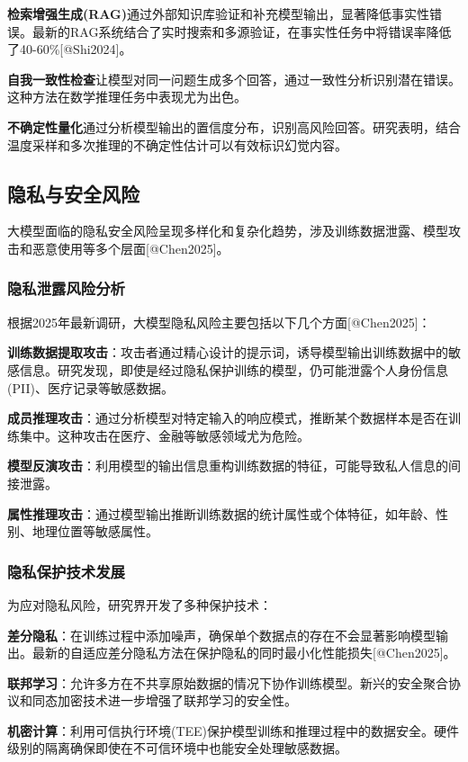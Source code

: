 \documentclass{article}
\begin{document}
\textbf{检索增强生成(RAG)}通过外部知识库验证和补充模型输出，显著降低事实性错误。最新的RAG系统结合了实时搜索和多源验证，在事实性任务中将错误率降低了40-60\%[@Shi2024]。

\textbf{自我一致性检查}让模型对同一问题生成多个回答，通过一致性分析识别潜在错误。这种方法在数学推理任务中表现尤为出色。

\textbf{不确定性量化}通过分析模型输出的置信度分布，识别高风险回答。研究表明，结合温度采样和多次推理的不确定性估计可以有效标识幻觉内容。

\subsection{隐私与安全风险}
大模型面临的隐私安全风险呈现多样化和复杂化趋势，涉及训练数据泄露、模型攻击和恶意使用等多个层面[@Chen2025]。

\subsubsection{隐私泄露风险分析}
根据2025年最新调研，大模型隐私风险主要包括以下几个方面[@Chen2025]：

\textbf{训练数据提取攻击}：攻击者通过精心设计的提示词，诱导模型输出训练数据中的敏感信息。研究发现，即使是经过隐私保护训练的模型，仍可能泄露个人身份信息(PII)、医疗记录等敏感数据。

\textbf{成员推理攻击}：通过分析模型对特定输入的响应模式，推断某个数据样本是否在训练集中。这种攻击在医疗、金融等敏感领域尤为危险。

\textbf{模型反演攻击}：利用模型的输出信息重构训练数据的特征，可能导致私人信息的间接泄露。

\textbf{属性推理攻击}：通过模型输出推断训练数据的统计属性或个体特征，如年龄、性别、地理位置等敏感属性。

\subsubsection{隐私保护技术发展}
为应对隐私风险，研究界开发了多种保护技术：

\textbf{差分隐私}：在训练过程中添加噪声，确保单个数据点的存在不会显著影响模型输出。最新的自适应差分隐私方法在保护隐私的同时最小化性能损失[@Chen2025]。

\textbf{联邦学习}：允许多方在不共享原始数据的情况下协作训练模型。新兴的安全聚合协议和同态加密技术进一步增强了联邦学习的安全性。

\textbf{机密计算}：利用可信执行环境(TEE)保护模型训练和推理过程中的数据安全。硬件级别的隔离确保即使在不可信环境中也能安全处理敏感数据。
\end{document}
